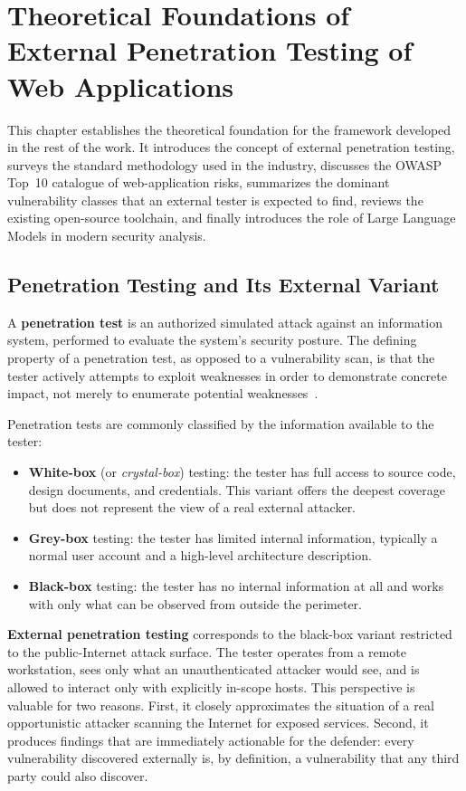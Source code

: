 \chapter[Theoretical Foundations]{Theoretical Foundations of External Penetration Testing of Web Applications}
\label{chap:01}
\setlength{\parskip}{1em}

This chapter establishes the theoretical foundation for the framework developed in the rest of the work. It introduces the concept of external penetration testing, surveys the standard methodology used in the industry, discusses the OWASP Top~10 catalogue of web-application risks, summarizes the dominant vulnerability classes that an external tester is expected to find, reviews the existing open-source toolchain, and finally introduces the role of Large Language Models in modern security analysis.

\section{Penetration Testing and Its External Variant}

A \textbf{penetration test} is an authorized simulated attack against an information system, performed to evaluate the system's security posture. The defining property of a penetration test, as opposed to a vulnerability scan, is that the tester actively attempts to exploit weaknesses in order to demonstrate concrete impact, not merely to enumerate potential weaknesses~\cite{nist_sp_800_115, ptes}.

Penetration tests are commonly classified by the information available to the tester:
\begin{itemize}
  \item \textbf{White-box} (or \textit{crystal-box}) testing: the tester has full access to source code, design documents, and credentials. This variant offers the deepest coverage but does not represent the view of a real external attacker.
  \item \textbf{Grey-box} testing: the tester has limited internal information, typically a normal user account and a high-level architecture description.
  \item \textbf{Black-box} testing: the tester has no internal information at all and works with only what can be observed from outside the perimeter.
\end{itemize}

\textbf{External penetration testing} corresponds to the black-box variant restricted to the public-Internet attack surface. The tester operates from a remote workstation, sees only what an unauthenticated attacker would see, and is allowed to interact only with explicitly in-scope hosts. This perspective is valuable for two reasons. First, it closely approximates the situation of a real opportunistic attacker scanning the Internet for exposed services. Second, it produces findings that are immediately actionable for the defender: every vulnerability discovered externally is, by definition, a vulnerability that any third party could also discover.


